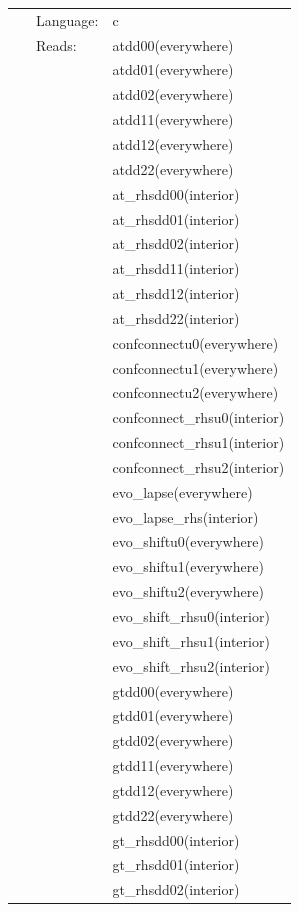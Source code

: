 \documentclass{article}
\begin{document}
 \begin{tabular*}{160mm}{cll} 
~ & Language:  & c \\ 
~ & Reads:  & atdd00(everywhere) \\ 
~& ~ &atdd01(everywhere)\\ 
~& ~ &atdd02(everywhere)\\ 
~& ~ &atdd11(everywhere)\\ 
~& ~ &atdd12(everywhere)\\ 
~& ~ &atdd22(everywhere)\\ 
~& ~ &at\_rhsdd00(interior)\\ 
~& ~ &at\_rhsdd01(interior)\\ 
~& ~ &at\_rhsdd02(interior)\\ 
~& ~ &at\_rhsdd11(interior)\\ 
~& ~ &at\_rhsdd12(interior)\\ 
~& ~ &at\_rhsdd22(interior)\\ 
~& ~ &confconnectu0(everywhere)\\ 
~& ~ &confconnectu1(everywhere)\\ 
~& ~ &confconnectu2(everywhere)\\ 
~& ~ &confconnect\_rhsu0(interior)\\ 
~& ~ &confconnect\_rhsu1(interior)\\ 
~& ~ &confconnect\_rhsu2(interior)\\ 
~& ~ &evo\_lapse(everywhere)\\ 
~& ~ &evo\_lapse\_rhs(interior)\\ 
~& ~ &evo\_shiftu0(everywhere)\\ 
~& ~ &evo\_shiftu1(everywhere)\\ 
~& ~ &evo\_shiftu2(everywhere)\\ 
~& ~ &evo\_shift\_rhsu0(interior)\\ 
~& ~ &evo\_shift\_rhsu1(interior)\\ 
~& ~ &evo\_shift\_rhsu2(interior)\\ 
~& ~ &gtdd00(everywhere)\\ 
~& ~ &gtdd01(everywhere)\\ 
~& ~ &gtdd02(everywhere)\\ 
~& ~ &gtdd11(everywhere)\\ 
~& ~ &gtdd12(everywhere)\\ 
~& ~ &gtdd22(everywhere)\\ 
~& ~ &gt\_rhsdd00(interior)\\ 
~& ~ &gt\_rhsdd01(interior)\\ 
~& ~ &gt\_rhsdd02(interior)\\ 

\end{tabular*}
\end{document}
